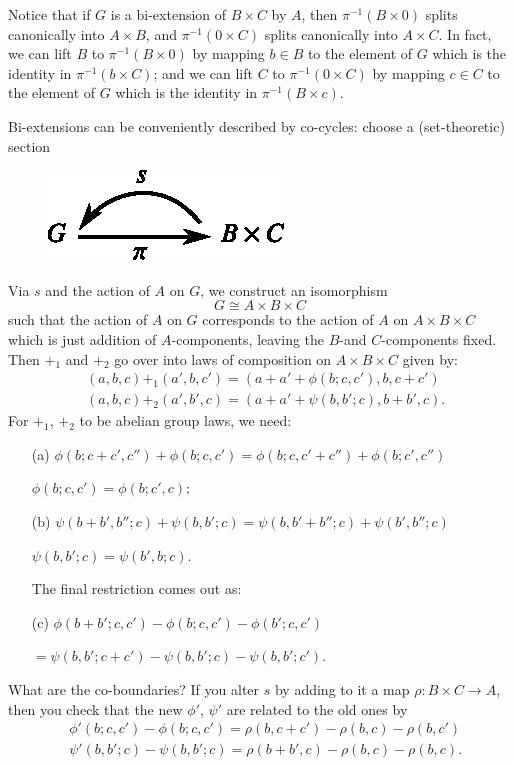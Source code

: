 Notice that if $G$ is a bi-extension of $B\times C$ by $A$, then $\pi^{-1}(B\times 0)$ splits canonically into $A\times B$, and $\pi^{-1}(0\times C)$ splits canonically into $A\times C$. In fact, we can lift $B$ to $\pi^{-1}(B\times 0)$ by mapping $b\in B$ to the element of $G$ which is the identity in $\pi^{-1}(b\times C)$; and we can lift $C$ to $\pi^{-1}(0\times C)$ by mapping $c\in C$ to the element of $G$ which is the identity in $\pi^{-1}(B\times c)$.

Bi-extensions can be conveniently described by co-cycles: choose a (set-theoretic) section
\begin{figure}[H]
\centering
\includegraphics{src/chap15/fig1.eps}
\end{figure}
Via $s$ and the action of $A$ on $G$, we construct an isomorphism
$$
G\cong A\times B\times C
$$
such that the action of $A$ on $G$ corresponds to the action of $A$ on $A\times B\times C$ which is just addition of $A$-components, leaving the $B$-and $C$-components fixed. Then $+_{1}$ and $+_{2}$ go over into laws of composition on $A\times B\times C$ given by:
\begin{align*}
& (a,b,c)+_{1}(a',b,c')=(a+a'+\phi(b;c,c'),b,c+c')\\
& (a,b,c)+_{2}(a',b',c)=(a+a'+\psi (b,b';c),b+b',c).
\end{align*}
For $+_{1}$, $+_{2}$ to be abelian group laws, we need:
\begin{itemize}
\item[(a)] $\phi(b;c+c',c'')+\phi(b;c,c')=\phi(b;c,c'+c'')+\phi(b;c',c'')$

\centerline{$\phi(b;c,c')=\phi(b;c',c);$}

\item[(b)] $\psi(b+b',b'';c)+\psi(b,b';c)=\psi(b,b'+b'';c)+\psi(b',b'';c)$

\centerline{$\psi(b,b';c)=\psi(b',b;c)$.}
\smallskip


The final restriction comes out as:
\item[(c)] $\phi(b+b';c,c')-\phi(b;c,c')-\phi(b';c,c')$\pageoriginale

$=\psi(b,b';c+c')-\psi(b,b';c)-\psi(b,b';c')$.
\end{itemize}
What are the co-boundaries? If you alter $s$ by adding to it a map $\rho:B\times C\to A$, then you check that the new $\phi'$, $\psi'$ are related to the old ones by
\begin{align*}
&\phi'(b;c,c')-\phi(b;c,c')=\rho(b,c+c')-\rho(b,c)-\rho(b,c')\\
&\psi'(b,b';c)-\psi(b,b';c)=\rho(b+b',c)-\rho(b,c)-\rho(b,c).
\end{align*}

